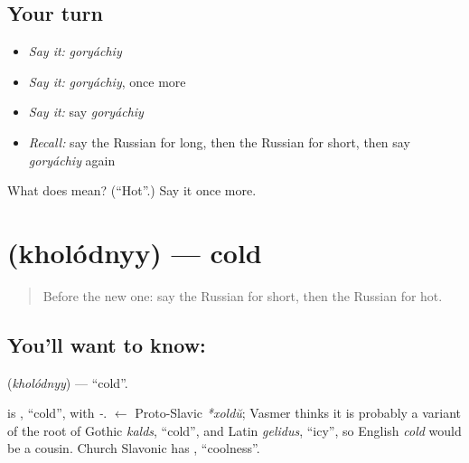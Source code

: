 \subsection*{Your turn}
\begin{itemize}
\raggedright
  \item \emph{Say it:} \emph{goryáchiy}
  \item \emph{Say it:} \emph{goryáchiy}, once more
  \item \emph{Say it:} say \emph{goryáchiy}
  \item \emph{Recall:} say the Russian for long, then the Russian for short, then say \emph{goryáchiy} again
\end{itemize}

\begin{tcolorbox}[breakable,colback=teal!4,colframe=teal!35!black,title={Before you move on}]
What does  mean? (\textquotedblleft{}Hot\textquotedblright{}.) Say it once more.
\end{tcolorbox}
\section[\texorpdfstring{\ru{холодный} (kholódnyy)}{холодный (kholódnyy)}]{ (kholódnyy) — cold}

\label{lesson:RU-C66-cold}



\begin{quote}
Before the new one: say the Russian for short, then the Russian for hot.
\end{quote}

\subsection*{You'll want to know: }
\textbf{} (\emph{kholódnyy}) — \textquotedblleft{}cold\textquotedblright{}.

\begin{cousinweb}
\textbf{} is \emph{}, \textquotedblleft{}cold\textquotedblright{}, with \emph{-}. \emph{} $\leftarrow$ Proto-Slavic \emph{*xoldŭ}; Vasmer thinks it is probably a variant of the root of Gothic \emph{kalds}, \textquotedblleft{}cold\textquotedblright{}, and Latin \emph{gelidus}, \textquotedblleft{}icy\textquotedblright{}, so English \emph{cold} would be a cousin. Church Slavonic has \emph{}, \textquotedblleft{}coolness\textquotedblright{}.
\end{cousinweb}

